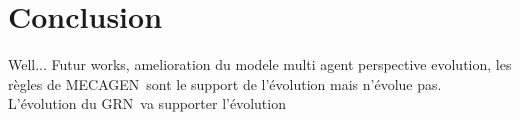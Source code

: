 

\section{Conclusion  }

   Well...      Futur works, amelioration du modele multi agent    perspective evolution, les règles de MECAGEN sont le support de l'évolution mais n'évolue pas. L'évolution du GRN va supporter l'évolution     
